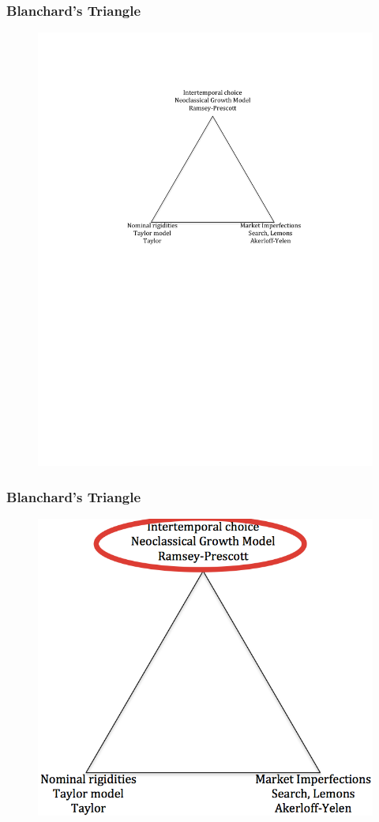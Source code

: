 \documentclass{beamer}
\begin{document}
\begin{frame}
\frametitle[alignment=center]{Blanchard's Triangle}
\begin{figure}
\centering
\includegraphics[scale=0.80]{Figures/BlanchardsTriangle-1.pdf}
\end{figure}
\end{frame}

\begin{frame}
\frametitle[alignment=center]{Blanchard's Triangle}
\begin{figure}
\centering
\includegraphics[scale=0.80]{Figures/BlanchardsTriangle-2.png}
\end{figure}
\end{frame}
\end{document}
